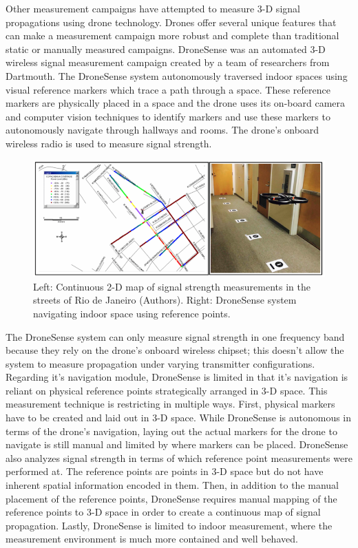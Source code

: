 \documentclass[pageno]{jpaper}
\begin{document}
Other measurement campaigns have attempted to measure 3-D signal propagations using drone technology. Drones offer several unique features that can make a measurement campaign more robust and complete than traditional static or manually measured campaigns. DroneSense was an automated 3-D wireless signal measurement campaign created by a team of researchers from Dartmouth. The DroneSense system autonomously traversed indoor spaces using visual reference markers which trace a path through a space. These reference markers are physically placed in a space and the drone uses its on-board camera and computer vision techniques to identify markers and use these markers to autonomously navigate through hallways and rooms. The drone's onboard wireless radio is used to measure signal strength.

\begin{figure}[h]
	\caption{Left: Continuous 2-D map of signal strength measurements in the streets of Rio de Janeiro (Authors). Right: DroneSense system navigating indoor space using reference points.}
	\includegraphics{related_work}
	\centering
\end{figure}

The DroneSense system can only measure signal strength in one frequency band because they rely on the drone's onboard wireless chipset; this doesn't allow the system to measure propagation under varying transmitter configurations. Regarding it's navigation module, DroneSense is limited in that it's navigation is reliant on physical reference points strategically arranged in 3-D space. This measurement technique is restricting in multiple ways. First, physical markers have to be created and laid out in 3-D space. While DroneSense is autonomous in terms of the drone's navigation, laying out the actual markers for the drone to navigate is still manual and limited by where markers can be placed. DroneSense also analyzes signal strength in terms of which reference point measurements were performed at. The reference points are points in 3-D space but do not have inherent spatial information encoded in them. Then, in addition to the manual placement of the reference points, DroneSense requires manual mapping of the reference points to 3-D space in order to create a continuous map of signal propagation. Lastly, DroneSense is limited to indoor measurement, where the measurement environment is much more contained and well behaved. 
\end{document}
